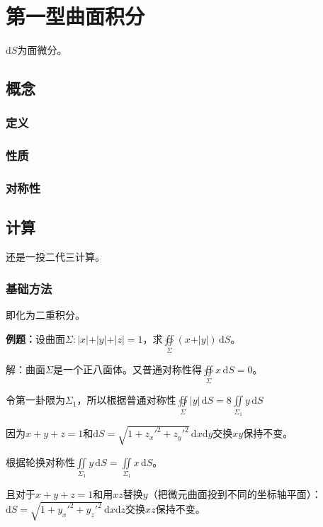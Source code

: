 \documentclass[UTF8, 12pt]{ctexart}
\begin{document}
\section{第一型曲面积分}

$\textrm{d}S$为面微分。

\subsection{概念}

\subsubsection{定义}

\subsubsection{性质}

\subsubsection{对称性}

\subsection{计算}

还是一投二代三计算。

\subsubsection{基础方法}

即化为二重积分。

\textbf{例题：}设曲面$\Sigma:\vert x\vert+\vert y\vert+\vert z\vert=1$，求$\oiint\limits_\Sigma(x+\vert y\vert)\,\textrm{d}S$。

解：曲面$\Sigma$是一个正八面体。又普通对称性得$\oiint\limits_\Sigma x\,\textrm{d}S=0$。

令第一卦限为$\Sigma_1$，所以根据普通对称性$\oiint\limits_\Sigma\vert y\vert\,\textrm{d}S=8\iint\limits_{\Sigma_1}y\,\textrm{d}S$

因为$x+y+z=1$和$\textrm{d}S=\sqrt{1+z_x'^2+z_y'^2}\,\textrm{d}x\textrm{d}y$交换$xy$保持不变。

根据轮换对称性$\iint\limits_{\Sigma_1}y\,\textrm{d}S=\iint\limits_{\Sigma_1}x\,\textrm{d}S$。

且对于$x+y+z=1$和用$xz$替换$y$（把微元曲面投到不同的坐标轴平面）：$\textrm{d}S=\sqrt{1+y_x'^2+y_z'^2}\,\textrm{d}x\textrm{d}z$交换$xz$保持不变。
\end{document}
